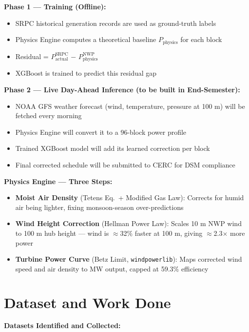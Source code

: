 \documentclass[11pt,a4paper]{article}
\begin{document}
\textbf{Phase 1 --- Training (Offline):}
\begin{itemize}
    \item SRPC historical generation records are used as ground-truth labels
    \item Physics Engine computes a theoretical baseline $P_\text{physics}$ for each block
    \item Residual = $P_\text{actual}^\text{SRPC}$ $-$ $P_\text{physics}^\text{NWP}$
    \item XGBoost is trained to predict this residual gap
\end{itemize}

\textbf{Phase 2 --- Live Day-Ahead Inference (to be built in End-Semester):}
\begin{itemize}
    \item NOAA GFS weather forecast (wind, temperature, pressure at 100 m) will be fetched every morning
    \item Physics Engine will convert it to a 96-block power profile
    \item Trained XGBoost model will add its learned correction per block
    \item Final corrected schedule will be submitted to CERC for DSM compliance
\end{itemize}

\textbf{Physics Engine --- Three Steps:}
\begin{itemize}
    \item \textbf{Moist Air Density} (Tetens Eq.\ + Modified Gas Law): Corrects for humid air being lighter, fixing monsoon-season over-predictions
    \item \textbf{Wind Height Correction} (Hellman Power Law): Scales 10 m NWP wind to 100 m hub height --- wind is $\approx$32\% faster at 100 m, giving $\approx$2.3$\times$ more power
    \item \textbf{Turbine Power Curve} (Betz Limit, \texttt{windpowerlib}): Maps corrected wind speed and air density to MW output, capped at 59.3\% efficiency
\end{itemize}

\section{Dataset and Work Done}

\textbf{Datasets Identified and Collected:}
\end{document}
